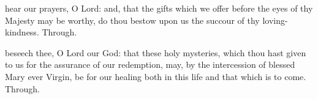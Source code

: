 \secret
{} hear our prayers, O Lord: and, that the gifts which we offer before the eyes of thy Majesty may be worthy, do thou bestow upon us the succour of thy loving-kindness. Through.


\postcommunion
{} beseech thee, O Lord our God: that these holy mysteries, which thou hast given to us for the assurance of our redemption, may, by the intercession of blessed Mary ever Virgin, be for our healing both in this life and that which is to come. Through.


%
  





